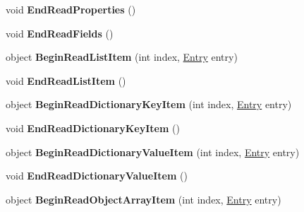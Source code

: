 \begin{DoxyCompactItemize}
void {\bfseries End\+Read\+Properties} ()
\item 
\mbox{\label{class_serialization_1_1_binary_serializer_a5083f578f8a2aff5fd5163edc802a0d1}} 
void {\bfseries End\+Read\+Fields} ()
\item 
\mbox{\label{class_serialization_1_1_binary_serializer_a8d689325716bdb8c393e16414fefd59f}} 
object {\bfseries Begin\+Read\+List\+Item} (int index, \hyperlink{class_serialization_1_1_entry}{Entry} entry)
\item 
\mbox{\label{class_serialization_1_1_binary_serializer_af0b58fefbd4bea88a09cffc7bdcef862}} 
void {\bfseries End\+Read\+List\+Item} ()
\item 
\mbox{\label{class_serialization_1_1_binary_serializer_ae4b30ced98b913465edd4dafb21da8c4}} 
object {\bfseries Begin\+Read\+Dictionary\+Key\+Item} (int index, \hyperlink{class_serialization_1_1_entry}{Entry} entry)
\item 
\mbox{\label{class_serialization_1_1_binary_serializer_a40a35f67bceb9c7c1cac774afe4b5fd0}} 
void {\bfseries End\+Read\+Dictionary\+Key\+Item} ()
\item 
\mbox{\label{class_serialization_1_1_binary_serializer_afd286629a7b6d4be74e344f7b692ce4d}} 
object {\bfseries Begin\+Read\+Dictionary\+Value\+Item} (int index, \hyperlink{class_serialization_1_1_entry}{Entry} entry)
\item 
\mbox{\label{class_serialization_1_1_binary_serializer_aa8214913ce84b050614e38c5aadc0b71}} 
void {\bfseries End\+Read\+Dictionary\+Value\+Item} ()
\item 
\mbox{\label{class_serialization_1_1_binary_serializer_ac4a4d8051a5c10d82e23fd004ad344fb}} 
object {\bfseries Begin\+Read\+Object\+Array\+Item} (int index, \hyperlink{class_serialization_1_1_entry}{Entry} entry)
\item 
\mbox{\label{class_serialization_1_1_binary_serializer_a3a649cab5370bcfe131307bcaf9156d2}} 

\end{DoxyCompactItemize}

